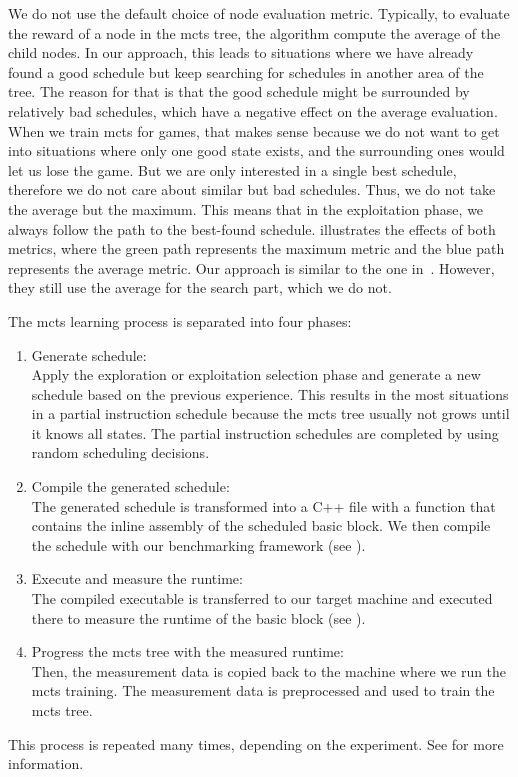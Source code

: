 We do not use the default choice of node evaluation metric.
Typically, to evaluate the reward of a node in the \ac{mcts} tree, the algorithm compute the average of the child nodes.
In our approach, this leads to situations where we have already found a good schedule but keep searching for schedules in another area of the tree.
The reason for that is that the good schedule might be surrounded by relatively bad schedules, which have a negative effect on the average evaluation.
When we train \ac{mcts} for games, that makes sense because we do not want to get into situations where only one good state exists, and the surrounding ones would let us lose the game.
But we are only interested in a single best schedule, therefore we do not care about similar but bad schedules.
Thus, we do not take the average but the maximum.
This means that in the exploitation phase, we always follow the path to the best-found schedule.
 illustrates the effects of both metrics, where the green path represents the maximum metric and the blue path represents the average metric.
Our approach is similar to the one in~\cite{bjornsson2009cadiaplayer}.
However, they still use the average for the search part, which we do not.

The \ac{mcts} learning process is separated into four phases:
\begin{enumerate}
    \item Generate schedule: \\
    Apply the exploration or exploitation selection phase and generate a new schedule based on the previous experience.
    This results in the most situations in a partial instruction schedule because the \ac{mcts} tree usually not grows until it knows all states.
    The partial instruction schedules are completed by using random scheduling decisions. 
    \item Compile the generated schedule: \\
    The generated schedule is transformed into a C++ file with a function that contains the inline assembly of the scheduled basic block.
    We then compile the schedule with our benchmarking framework (see ).
    \item Execute and measure the runtime: \\
    The compiled executable is transferred to our target machine and executed there to measure the runtime of the basic block (see ).
    \item Progress the \ac{mcts} tree with the measured runtime: \\
    Then, the measurement data is copied back to the machine where we run the \ac{mcts} training.
    The measurement data is preprocessed and used to train the \ac{mcts} tree.
\end{enumerate}
This process is repeated many times, depending on the experiment.
See  for more information.


